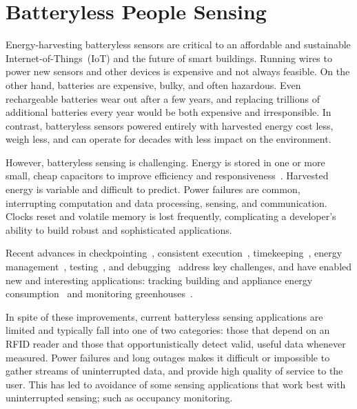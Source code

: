 \section{Batteryless People Sensing}
\label{sec:background}

Energy-harvesting batteryless sensors are critical to an affordable and sustainable Internet-of-Things~(IoT) and the future of smart buildings.
%
Running wires to power new sensors and other devices is expensive and not always feasible.
On the other hand, batteries are expensive, bulky, and often hazardous.
Even rechargeable batteries wear out after a few years, and replacing trillions of additional batteries every year would be both expensive and irresponsible.
%
In contrast, batteryless sensors powered entirely with harvested energy cost less, weigh less, and can operate for decades with less impact on the environment.

However, batteryless sensing is challenging.
Energy is stored in one or more small, cheap capacitors to improve efficiency and responsiveness~\cite{jhester:ufop:sensys}.
Harvested energy is variable and difficult to predict.
Power failures are common, interrupting computation and data processing, sensing, and communication.
Clocks reset and volatile memory is lost frequently, complicating a developer's ability to build robust and sophisticated applications.

Recent advances in checkpointing~\cite{ransford2011mementos, balsamo2015hibernus}, consistent execution~\cite{colin2016chain, Lucia:2015:Dino}, timekeeping~\cite{hester2016persistent}, energy management~\cite{jhester:ufop:sensys}, testing~\cite{ekho-sensys}, and debugging~\cite{colin_edb} address key challenges, and have enabled new and interesting applications: tracking building and appliance energy consumption~\cite{debruin2013monjolo,campbell2014energy} and monitoring greenhouses~\cite{jhester:ufop:sensys}.


In spite of these improvements, current batteryless sensing applications are limited and typically fall into one of two categories: those that depend on an RFID reader and those that opportunistically detect valid, useful data whenever measured. 
Power failures and long outages makes it difficult or impossible to gather streams of uninterrupted data, and provide high quality of service to the user.
This has led to avoidance of some sensing applications that work best with uninterrupted sensing; such as occupancy monitoring. 

